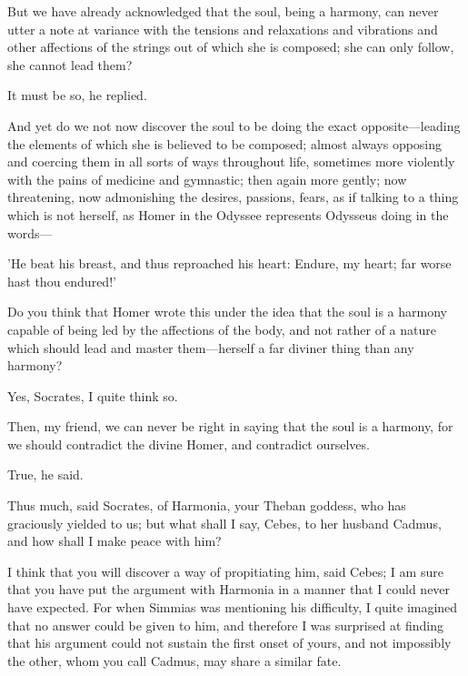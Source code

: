 But we have already acknowledged that the soul, being a harmony, can never
utter a note at variance with the tensions and relaxations and vibrations
and other affections of the strings out of which she is composed; she can
only follow, she cannot lead them?

It must be so, he replied.

And yet do we not now discover the soul to be doing the exact opposite—leading
the elements of which she is believed to be composed; almost always
opposing and coercing them in all sorts of ways throughout life, sometimes
more violently with the pains of medicine and gymnastic; then again more
gently; now threatening, now admonishing the desires, passions, fears, as
if talking to a thing which is not herself, as Homer in the Odyssee
represents Odysseus doing in the words—

'He beat his breast, and thus reproached his heart: Endure, my heart; far
worse hast thou endured!'

Do you think that Homer wrote this under the idea that the soul is a
harmony capable of being led by the affections of the body, and not rather
of a nature which should lead and master them—herself a far diviner
thing than any harmony?

Yes, Socrates, I quite think so.

Then, my friend, we can never be right in saying that the soul is a
harmony, for we should contradict the divine Homer, and contradict
ourselves.

True, he said.

Thus much, said Socrates, of Harmonia, your Theban goddess, who has
graciously yielded to us; but what shall I say, Cebes, to her husband
Cadmus, and how shall I make peace with him?

I think that you will discover a way of propitiating him, said Cebes; I am
sure that you have put the argument with Harmonia in a manner that I could
never have expected. For when Simmias was mentioning his difficulty, I
quite imagined that no answer could be given to him, and therefore I was
surprised at finding that his argument could not sustain the first onset
of yours, and not impossibly the other, whom you call Cadmus, may share a
similar fate.

